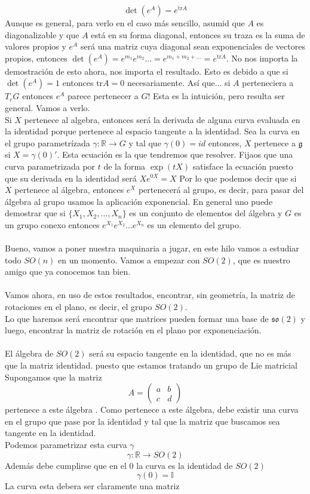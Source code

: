 \documentclass[12pt]{article}
\begin{document}
\begin{equation}
    \det (e^A)=e^{\text{tr}A}
\end{equation}
Aunque es general, para verlo en el caso más sencillo, asumid que $A$ es diagonalizable y que $A$ está en su forma diagonal, entonces su traza es la suma de valores propios y  $e^A$ será una matriz cuya diagonal sean exponenciales de vectores propios, entonces $\det (e^A) =e^{m_1}e^{m_2}\dots=e^{m_1+m_2+\dots} =e^{\text{tr}A}$. No nos importa la demostración de esto ahora, nos importa el resultado. Esto es debido a que si $\det (e^A)=1$ entonces $\text{tr}A=0$ necesariamente. Así que... si $A$ perteneciera a $T_eG$ entonces $e^A$ parece pertenecer a $G$! Esta es la intuición, pero resulta ser general. Vamos a verlo.\\
Si $X$ pertenece al algebra, entonces será la derivada de alguna curva evaluada en la identidad porque pertenece al espacio tangente a la identidad. Sea la curva en el grupo parametrízada $\gamma: \mathbb{R}\rightarrow G$ y tal que $\gamma(0)=id$  entonces, $X$ pertenece a
$\mathfrak{g}$ si $X=\gamma(0)'$. Esta ecuación es la que tendremos que resolver. Fijaos que una curva parametrizada por $t$ de la forma $\exp(tX)$ satisface la ecuación puesto que su derivada en la identidad será $Xe^{0X}=X$ Por lo que podemos decir que si $X$ pertenece al álgebra, entonces $e^X$ pertenecerá al grupo, es decir, para pasar del álgebra al grupo usamos la aplicación exponencial. En general uno puede demostrar que si $\{X_1,X_2,\dots, X_n\}$ es un conjunto de elementos del álgebra y $G$ es un grupo conexo entonces 
$e^{X_1}e^{X_2}\dots e^{X_n}$ es un elemento del grupo.\\\\ 
Bueno, vamos a poner nuestra maquinaria a jugar, en este hilo vamos a estudiar todo $SO(n)$ en un momento. Vamos a empezar con $SO(2)$, que es nuestro amigo que ya conocemos tan bien. \\\\
Vamos ahora, en uso de estos resultados, encontrar, sin geometría, la matriz de rotaciones en el plano, es decir, el grupo $SO(2)$. \\ Lo que haremos será encontrar que matrices pueden formar una base de $\mathfrak{so(2)}$ y luego, encontrar la matriz de rotación en el plano por exponenciación.\\\\
El álgebra de $SO(2)$ será su espacio tangente en la identidad, que no es más que la matriz identidad. puesto que estamos tratando un grupo de Lie matricial
Supongamos que la matriz
$$A= \begin{pmatrix}
	a & b \\
	c & d
\end{pmatrix}$$
pertenece a este álgebra . Como pertenece a este álgebra, debe existir una curva en el grupo que pase por la identidad y tal que la matriz que buscamos sea tangente en la identidad.  \\
Podemos parametrizar esta curva $\gamma$ 
$$\gamma:\mathbb{R}\rightarrow SO(2)$$
Además debe cumplirse que en el 0 la curva es la identidad de $SO(2)$ 
$$\gamma(0)=\mathbb{I}$$
La curva esta debera ser claramente una matriz 
\end{document}
